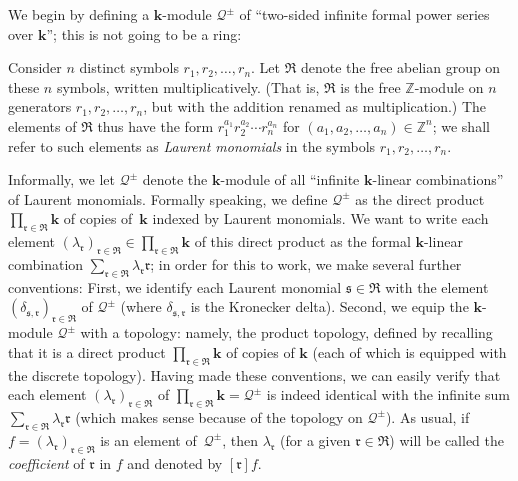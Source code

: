 \documentclass[pdftex]{sigma}
\numberwithin{equation}{section}
\let\sumnonlimits\sum
\let\prodnonlimits\prod
\renewcommand{\sum}{\sumnonlimits\limits}
\renewcommand{\prod}{\prodnonlimits\limits}
\begin{document}
We begin by defining a $\mathbf{k}$-module $\mathcal{Q}^{\pm}$ of ``two-sided infinite formal power series over $\mathbf{k}$''; this is not going to be a ring:

\begin{Definition} \label{def.Qbig}Consider $n$ distinct symbols $r_{1},r_{2},\ldots,r_{n}$. Let $\mathfrak{R}$ denote the free abelian group on these $n$ symbols, written multiplicatively. (That is, $\mathfrak{R}$ is the free $\mathbb{Z}$-module on $n$ generators $r_{1},r_{2},\ldots,r_{n}$, but with the addition renamed as multiplication.) The elements of $\mathfrak{R}$ thus have the form $r_{1}^{a_{1}}r_{2}^{a_{2}}\cdots r_{n}^{a_{n}}$ for $( a_{1},a_{2},\ldots,a_{n}) \in\mathbb{Z}^{n}$; we shall refer to such elements as \textit{Laurent monomials} in the symbols $r_{1},r_{2},\ldots,r_{n}$.

Informally, we let $\mathcal{Q}^{\pm}$ denote the $\mathbf{k}$-module of all ``infinite $\mathbf{k}$-linear combinations'' of Laurent monomials. Formally speaking, we define $\mathcal{Q}^{\pm}$ as the direct product $\prod_{\mathfrak{r}\in\mathfrak{R}}\mathbf{k}$ of copies of~$\mathbf{k}$ indexed by Laurent monomials. We want to write each element $ ( \lambda_{\mathfrak{r}}) _{\mathfrak{r}\in\mathfrak{R}}\in \prod_{\mathfrak{r}\in\mathfrak{R}}\mathbf{k}$ of this direct product as the formal $\mathbf{k}$-linear combination $\sum_{\mathfrak{r}\in\mathfrak{R}}\lambda_{\mathfrak{r}}\mathfrak{r}$; in order for this to work, we make
several further conventions: First, we identify each Laurent monomial $\mathfrak{s}\in\mathfrak{R}$ with the element $( \delta_{\mathfrak{s},\mathfrak{r}}) _{\mathfrak{r}\in\mathfrak{R}}$ of $\mathcal{Q}^{\pm}$ (where $\delta_{\mathfrak{s},\mathfrak{r}}$ is the Kronecker delta). Second, we equip the $\mathbf{k}$-module $\mathcal{Q}^{\pm}$ with a topology: namely, the product topology, defined by recalling that it is a direct product
$\prod_{\mathfrak{r}\in\mathfrak{R}}\mathbf{k}$ of copies of $\mathbf{k}$ (each of which is equipped with the discrete topology). Having made these conventions, we can easily verify that each element $( \lambda_{\mathfrak{r}}) _{\mathfrak{r}\in\mathfrak{R}}$ of $\prod_{\mathfrak{r}\in\mathfrak{R}}\mathbf{k}=\mathcal{Q}^{\pm}$ is indeed identical with the infinite sum $\sum_{\mathfrak{r}\in\mathfrak{R}}\lambda_{\mathfrak{r}}\mathfrak{r}$ (which makes sense because of the topology on $\mathcal{Q}^{\pm}$). As usual, if $f= ( \lambda_{\mathfrak{r}} ) _{\mathfrak{r}\in\mathfrak{R}}$ is an element of~$\mathcal{Q}^{\pm}$, then $\lambda_{\mathfrak{r}}$ (for a given $\mathfrak{r}\in\mathfrak{R}$) will be called the \textit{coefficient} of $\mathfrak{r}$ in $f$ and denoted by $ [ \mathfrak{r} ] f$.
\end{Definition}
\end{document}
